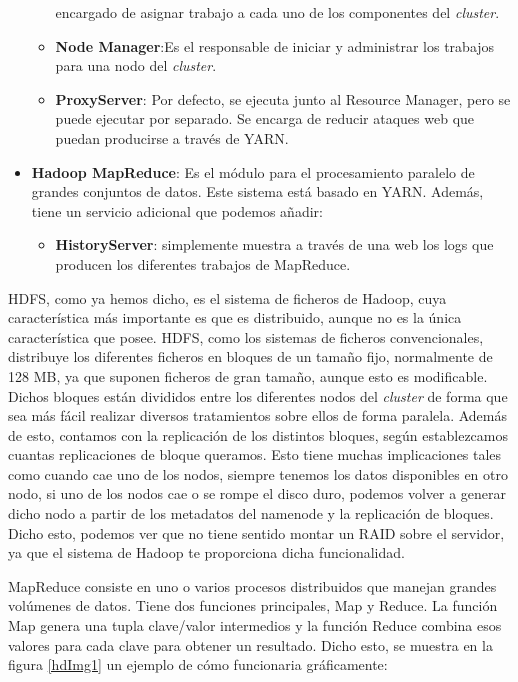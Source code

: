 \begin{itemize}
\begin{itemize}
    encargado de asignar trabajo a cada uno de los componentes del \emph{cluster}.
  \item \textbf{Node Manager}:Es el responsable de iniciar y administrar
    los trabajos para una nodo del \emph{cluster}.
  \item \textbf{ProxyServer}: Por defecto, se ejecuta junto al Resource
    Manager, pero se puede ejecutar por separado. Se encarga de reducir
    ataques web que puedan producirse a través de YARN.
  \end{itemize}
\item \textbf{Hadoop MapReduce}: Es el módulo para el procesamiento
  paralelo de grandes conjuntos de datos. Este sistema está basado en YARN.
  Además, tiene un servicio adicional que podemos añadir:
  \begin{itemize}
  \item \textbf{HistoryServer}: simplemente muestra a través de una web los
    logs que producen los diferentes trabajos de MapReduce.
  \end{itemize}
\end{itemize}

HDFS, como ya hemos dicho, es el sistema de ficheros de Hadoop, cuya
característica más importante es que es distribuido, aunque no es la única
característica que posee. HDFS, como los sistemas de ficheros
convencionales, distribuye los diferentes ficheros en bloques de un tamaño
fijo, normalmente de 128 MB, ya que suponen ficheros de gran tamaño, aunque
esto es modificable. Dichos bloques están divididos entre los diferentes
nodos del \emph{cluster} de forma que sea más fácil realizar diversos tratamientos
sobre ellos de forma paralela. Además de esto, contamos con la replicación
de los distintos bloques, según establezcamos cuantas replicaciones de
bloque queramos. Esto tiene muchas implicaciones tales como cuando cae uno
de los nodos, siempre tenemos los datos disponibles en otro nodo, si uno de
los nodos cae o se rompe el disco duro, podemos volver a generar dicho nodo
a partir de los metadatos del namenode y la replicación de bloques. Dicho
esto, podemos ver que no tiene sentido montar un RAID sobre el servidor, ya
que el sistema de Hadoop te proporciona dicha funcionalidad.

MapReduce consiste en uno o varios procesos distribuidos que manejan
grandes volúmenes de datos. Tiene dos funciones principales, Map y Reduce.
La función Map genera una tupla clave/valor intermedios y la función Reduce
combina esos valores para cada clave para obtener un resultado. Dicho esto,
se muestra en la figura \ref{hdImg1} \cite{Hdp-1} un ejemplo de cómo
funcionaria gráficamente:

